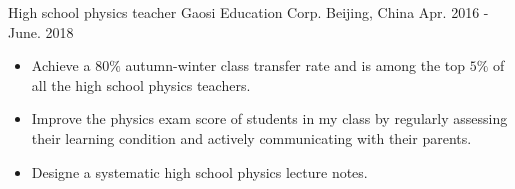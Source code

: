 
\begin{cventries}
    \cventry
    {High school physics teacher}
    {Gaosi Education Corp.}
    {Beijing, China}
    {Apr. 2016 - June. 2018}
    {
        \vspace{-4.5mm}
        \begin{itemize}[topsep=-2mm]
            \item Achieve a $80\%$ autumn-winter class transfer rate and is among the top $5\%$ of all the high school physics teachers.
            \item Improve the physics exam score of students in my class by regularly assessing their learning condition and actively communicating with their parents.
            \item Designe a systematic high school physics lecture notes.
        \end{itemize}
    }
\end{cventries}

